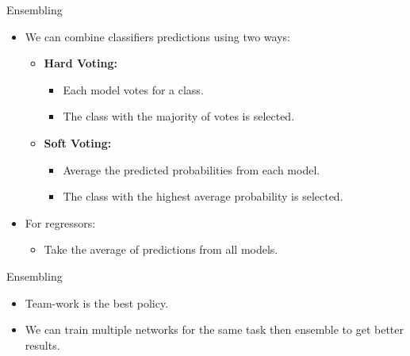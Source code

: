 \documentclass[10pt]{beamer}
\theoremstyle{remark}
\theoremstyle{definition}
\begin{document}
\begin{frame}{Ensembling}
\begin{itemize}
\item We can combine classifiers predictions using two ways:
\begin{itemize}
    \item \textbf{Hard Voting:}
    \begin{itemize}
        \item Each model votes for a class.
        \item The class with the majority of votes is selected.
    \end{itemize}
    \item \textbf{Soft Voting:}
    \begin{itemize}
        \item Average the predicted probabilities from each model.
        \item The class with the highest average probability is selected.
    \end{itemize}
\end{itemize}
\end{itemize}
\begin{itemize}
\item For regressors:
    \begin{itemize}
        \item Take the average of predictions from all models.
        \end{itemize}
\end{itemize}
\end{frame}


\begin{frame}{Ensembling}
    \begin{itemize}
        \item Team-work is the best policy.
        \item We can train multiple networks for the same task then ensemble to get better results.
    \end{itemize}

\end{frame}
\end{document}
